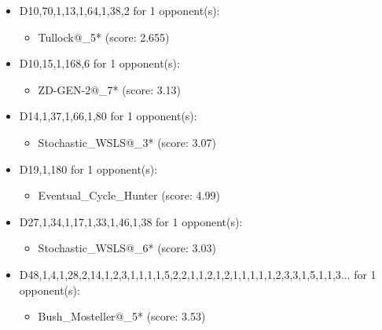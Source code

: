 \begin{appendices}
\begin{itemize}
    \item D10,70,1,13,1,64,1,38,2 for 1 opponent(s):
    \begin{multicols}{3}
         \begin{itemize}
            \item Tullock@\_5* (score: 2.655)
        \end{itemize}
     \end{multicols}
     
    \item D10,15,1,168,6 for 1 opponent(s):
    \begin{multicols}{3}
         \begin{itemize}
            \item ZD-GEN-2@\_7* (score: 3.13)
        \end{itemize}
     \end{multicols}
     
    \item D14,1,37,1,66,1,80 for 1 opponent(s):
    \begin{multicols}{3}
         \begin{itemize}
            \item Stochastic\_WSLS@\_3* (score: 3.07)
        \end{itemize}
     \end{multicols}
     
    \item D19,1,180 for 1 opponent(s):
    \begin{multicols}{3}
         \begin{itemize}
            \item Eventual\_Cycle\_Hunter (score: 4.99)
        \end{itemize}
     \end{multicols}
     
    \item D27,1,34,1,17,1,33,1,46,1,38 for 1 opponent(s):
    \begin{multicols}{3}
         \begin{itemize}
            \item Stochastic\_WSLS@\_6* (score: 3.03)
        \end{itemize}
     \end{multicols}
     
    \item D48,1,4,1,28,2,14,1,2,3,1,1,1,1,5,2,2,1,1,2,1,2,1,1,1,1,1,2,3,3,1,5,1,1,3... for 1 opponent(s):
    \begin{multicols}{3}
         \begin{itemize}
            \item Bush\_Mosteller@\_5* (score: 3.53)
        \end{itemize}
     \end{multicols}
     

\end{itemize}
\end{appendices}
